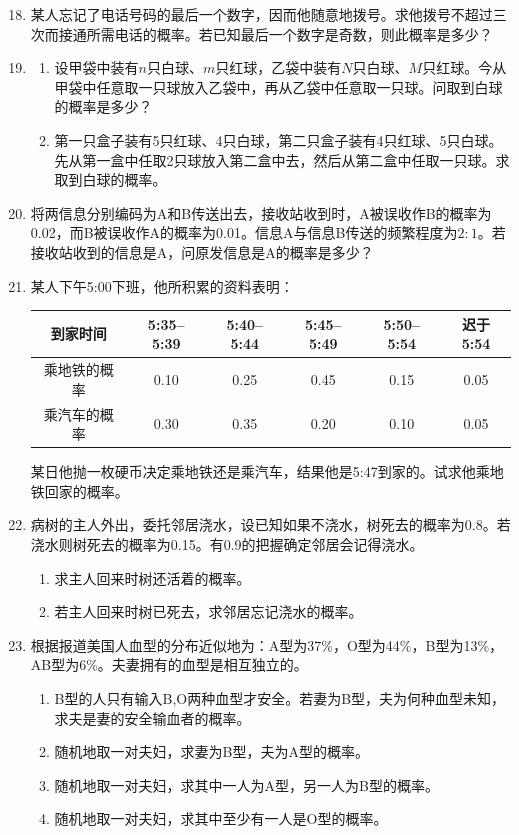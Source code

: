 \documentclass[UTF8]{ctexart}
\begin{document}
\begin{enumerate}
\setcounter{enumi}{17}
\item 某人忘记了电话号码的最后一个数字，因而他随意地拨号。求他拨号不超过三次而接通所需电话的概率。若已知最后一个数字是奇数，则此概率是多少？

\item 
\begin{enumerate}
\item[(1)] 设甲袋中装有$n$只白球、$m$只红球，乙袋中装有$N$只白球、$M$只红球。今从甲袋中任意取一只球放入乙袋中，再从乙袋中任意取一只球。问取到白球的概率是多少？
\item[(2)] 第一只盒子装有5只红球、4只白球，第二只盒子装有4只红球、5只白球。先从第一盒中任取2只球放入第二盒中去，然后从第二盒中任取一只球。求取到白球的概率。
\end{enumerate}

\setcounter{enumi}{22}
\item 将两信息分别编码为A和B传送出去，接收站收到时，A被误收作B的概率为0.02，而B被误收作A的概率为0.01。信息A与信息B传送的频繁程度为$2:1$。若接收站收到的信息是A，问原发信息是A的概率是多少？

\setcounter{enumi}{24}
\item 某人下午5:00下班，他所积累的资料表明：
\begin{center}
\begin{tabular}{|c|c|c|c|c|c|}
\hline
到家时间 & 5:35--5:39 & 5:40--5:44 & 5:45--5:49 & 5:50--5:54 & 迟于5:54 \\
\hline
乘地铁的概率 & 0.10 & 0.25 & 0.45 & 0.15 & 0.05 \\
\hline
乘汽车的概率 & 0.30 & 0.35 & 0.20 & 0.10 & 0.05 \\
\hline
\end{tabular}
\end{center}
某日他抛一枚硬币决定乘地铁还是乘汽车，结果他是5:47到家的。试求他乘地铁回家的概率。

\item 病树的主人外出，委托邻居浇水，设已知如果不浇水，树死去的概率为0.8。若浇水则树死去的概率为0.15。有0.9的把握确定邻居会记得浇水。
\begin{enumerate}
\item[(1)] 求主人回来时树还活着的概率。
\item[(2)] 若主人回来时树已死去，求邻居忘记浇水的概率。
\end{enumerate}

\setcounter{enumi}{28}
\item 根据报道美国人血型的分布近似地为：A型为37\%，O型为44\%，B型为13\%，AB型为6\%。夫妻拥有的血型是相互独立的。
\begin{enumerate}
\item[(1)] B型的人只有输入B,O两种血型才安全。若妻为B型，夫为何种血型未知，求夫是妻的安全输血者的概率。
\item[(2)] 随机地取一对夫妇，求妻为B型，夫为A型的概率。
\item[(3)] 随机地取一对夫妇，求其中一人为A型，另一人为B型的概率。
\item[(4)] 随机地取一对夫妇，求其中至少有一人是O型的概率。
\end{enumerate}


\end{enumerate}
\end{document}
